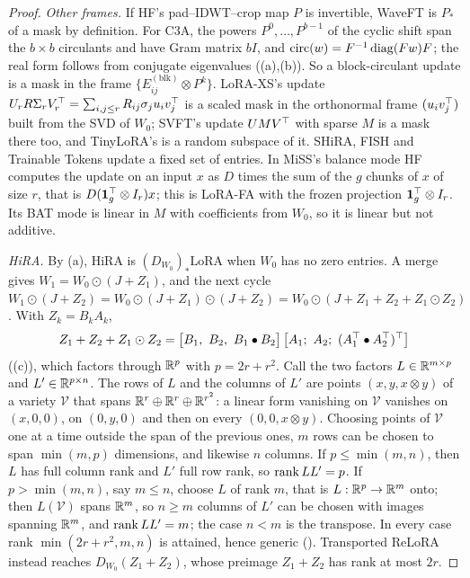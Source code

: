 \begin{proof}
\emph{Other frames.} If HF's pad--IDWT--crop map $P$ is invertible, WaveFT is $P_*$ of a mask by definition. For C3A, the
powers $P^0,\dots,P^{b-1}$ of the cyclic shift span the $b\times b$ circulants and have Gram matrix $bI$, and
$\operatorname{circ}(w)=F^{-1}\operatorname{diag}(Fw)F$; the real form follows from conjugate eigenvalues ((a),(b)). So a
block-circulant update is a mask in the frame $\{E^{(\mathrm{blk})}_{ij}\otimes P^k\}$. LoRA-XS's update
$U_rR\Sigma_rV_r^{\top}=\sum_{i,j\le r}R_{ij}\sigma_ju_iv_j^{\top}$ is a scaled mask in the orthonormal frame $(u_iv_j^{\top})$ built from the SVD
of $W_0$; SVFT's update $U M V^{\top}$ with sparse $M$ is a mask there too, and TinyLoRA's is a random subspace of it. SHiRA,
FISH and Trainable Tokens update a fixed set of entries. In MiSS's balance mode HF computes the update on an input $x$ as
$D$ times the sum of the $g$ chunks of $x$ of size $r$, that is $D(\mathbf 1_g^{\top}\otimes I_r)x$; this is LoRA-FA with the frozen
projection $\mathbf 1_g^{\top}\otimes I_r$. Its BAT mode is linear in $M$ with coefficients from $W_0$, so it is linear but not additive.

\emph{HiRA.} By (a), HiRA is $(D_{W_0})_*\mathrm{LoRA}$ when $W_0$ has no zero entries. A merge
gives $W_1=W_0\odot(J+Z_1)$, and the next cycle $W_1\odot(J+Z_2)=W_0\odot(J+Z_1)\odot(J+Z_2)=W_0\odot(J+Z_1+Z_2+Z_1\odot Z_2)$.
With $Z_k=B_kA_k$,
\begin{equation*}
  Z_1+Z_2+Z_1\odot Z_2=\big[B_1,\ B_2,\ B_1\bullet B_2\big]\,\big[A_1;\ A_2;\ (A_1\T\bullet A_2\T)\T\big]
\end{equation*}
((c)), which factors through $\mathbb{R}^p$ with $p=2r+r^2$. Call the two factors $L\in\mathbb{R}^{m\times p}$ and
$L'\in\mathbb{R}^{p\times n}$. The rows of $L$ and the columns of $L'$ are points $(x,y,x\otimes y)$ of a variety $\mathcal V$ that
spans $\mathbb{R}^r\oplus\mathbb{R}^r\oplus\mathbb{R}^{r^2}$: a linear form vanishing on $\mathcal V$ vanishes on $(x,0,0)$, on $(0,y,0)$ and then on
every $(0,0,x\otimes y)$. Choosing points of $\mathcal V$ one at a time outside the span of the previous ones, $m$ rows can be
chosen to span $\min(m,p)$ dimensions, and likewise $n$ columns. If $p\le\min(m,n)$, then $L$ has full column rank and $L'$
full row rank, so $\operatorname{rank} LL'=p$. If $p>\min(m,n)$, say $m\le n$, choose $L$ of rank $m$, that is $L:\mathbb{R}^p\to\mathbb{R}^m$ onto; then
$L(\mathcal V)$ spans $\mathbb{R}^m$, so $n\ge m$ columns of $L'$ can be chosen with images spanning $\mathbb{R}^m$, and $\operatorname{rank} LL'=m$; the case
$n<m$ is the transpose. In every case rank $\min(2r+r^2,m,n)$ is attained, hence generic (). Transported ReLoRA instead reaches $D_{W_0}(Z_1+Z_2)$, whose preimage $Z_1+Z_2$ has rank at most $2r$.
\end{proof}

